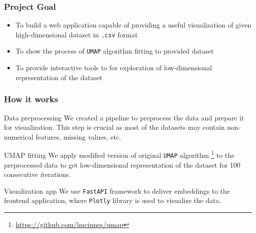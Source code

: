 \documentclass[aspectratio=169]{beamer}
\begin{document}
\begin{frame}
	\frametitle{Project Goal}
	\begin{itemize}
		\item To build a web application capable of providing
		      a useful visualization of given high-dimensional dataset
		      in \texttt{.csv} format
		\item To show the process of \texttt{UMAP} algorithm fitting
		      to provided dataset
		\item To provide interactive tools to for exploration of
		      low-dimensional representation of the dataset
	\end{itemize}

\end{frame}



\begin{frame}
	\frametitle{How it works}
	\begin{block}{Data preprocessing}
		We created a pipeline to preprocess the data
		and prepare it for visualization. This step is crucial
		as most of the datasets may contain non-numerical features,
		missing values, etc.
	\end{block}

	\begin{block}{UMAP fitting}
		We apply modified version of original \texttt{UMAP} algorithm 
		\footnote{\url{https://github.com/lmcinnes/umap}}
		to the preprocessed data to get low-dimensional representation
		of the dataset for 100 consecutive iterations.
	\end{block}

	\begin{block}{Visualization app}
		We use \texttt{FastAPI} framework to deliver embeddings to the
		frontend application, where \texttt{Plotly} library is used to
		visualize the data.
	\end{block}
\end{frame}
\end{document}

